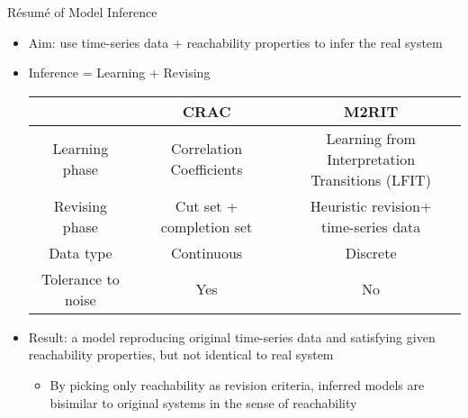 \documentclass[8pt]{beamer}
\begin{document}
\begin{frame}{R\'esum\'e of Model Inference}    
\begin{itemize}
\item<+-> Aim: use time-series data + reachability properties to infer the real system
\item<+-> Inference = Learning + Revising
\begin{tabular}{c|c|c}
     &CRAC & M2RIT \\
     \hline
    Learning phase & Correlation Coefficients & \makecell{Learning from Interpretation\\ Transitions (LFIT)}\\
     \hline
     Revising phase & \makecell{Cut set +\\ completion set} & \makecell{Heuristic revision+\\time-series data}\\
     \hline
     Data type &Continuous & Discrete\\
     \hline
     \makecell{Tolerance to\\ noise}&Yes&No
\end{tabular}
\item<+-> Result: a model reproducing original time-series data and satisfying given reachability properties, but not identical to real system
\begin{itemize}
    \item<+-> By picking only reachability as revision criteria, inferred models are bisimilar to original systems in the sense of reachability
\end{itemize}
\end{itemize}
\end{frame}
\end{document}
